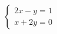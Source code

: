 $\displaystyle
\left\{
\begin{array}{l}
\displaystyle 2x - y = 1 \\
\displaystyle x+2y = 0
\end{array}
\right.
$
